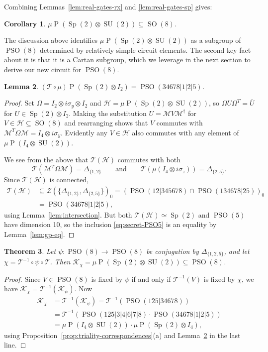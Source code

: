\documentclass[reqno]{amsart}
\newtheorem{theorem}{Theorem}[section]
\newtheorem{lemma}[theorem]{Lemma}
\newtheorem{corollary}[theorem]{Corollary}
\theoremstyle{definition} \newtheorem{example}[theorem]{Example}
\newcommand{\SU}{\operatorname{SU}}
\newcommand{\SO}{\operatorname{SO}}
\newcommand{\PSO}{\operatorname{PSO}}
\newcommand{\Sp}{\operatorname{Sp}}
\renewcommand{\P}{\operatorname{P}}
\renewcommand{\H}{\mathcal{H}}
\newcommand{\K}{\mathcal{K}}
\newcommand{\T}{\mathcal{T}}
\newcommand{\M}{\mathcal{M}}
\newcommand{\Z}{\mathcal{Z}}
\begin{document}
Combining Lemmas~\ref{lem:real-gates-rx} and \ref{lem:real-gates-sp} gives:
\begin{corollary} \label{cor:real-sp}
$\mu\P(\Sp(2) \otimes \SU(2))\subseteq \SO(8)$.
\end{corollary}

The discussion above identifies $\mu\P(\Sp(2) \otimes \SU(2))$ as a subgroup of $\PSO(8)$ determined by relatively simple circuit elements. The second key fact about it is that it is a Cartan subgroup, which we leverage in the next section to derive our new circuit for $\PSO(8)$.
\begin{lemma} \label{lem:triality-sp2} $(\T \circ \mu)\P(\Sp(2) \otimes I_2) = \PSO(34678|1|2|5)$.
\end{lemma}
\begin{proof}
Set $\Omega = I_2 \otimes i\sigma_y \otimes I_2$ and $\H = \mu\P(\Sp(2) \otimes \SU(2))$, so $\Omega U \Omega^T = \overline{U}$ for $U \in \Sp(2) \otimes I_2$. Making the substitution $U = \M V \M^\dagger$ for $V \in \H \subseteq \SO(8)$ and rearranging shows that $V$ commutes with $\M^T \Omega \M = I_4 \otimes i\sigma_y$. Evidently any $V \in \H$ also commutes with any element of $\mu\P(I_4 \otimes \SU(2))$.

We see from the above that $\T(\H)$ commutes with both
\begin{equation*}
\T(\M^T \Omega \M) = \Delta_{\{1,2\}} \qquad \text{and} \qquad \T(\mu(I_4 \otimes i\sigma_z)) = \Delta_{\{2,5\}}.
\end{equation*}
Since $\T(\H)$ is connected, 
\begin{align} \label{eq:secret-PSO5}
\T(\H) &\subseteq \Z(\{\Delta_{\{1,2\}},\Delta_{\{2,5\}}\})_0 = (\PSO(12|345678) \cap \PSO(134678|25))_0 \nonumber\\
&= \PSO(34678|1|2|5),
\end{align}
using Lemma~\ref{lem:intersection}. But both $\T(\H) \simeq \Sp(2)$ and $\PSO(5)$ have dimension 10, so the inclusion \eqref{eq:secret-PSO5} is an equality by Lemma~\ref{lem:gp-eq}.
\end{proof}


\begin{theorem} \label{thm:key-subgroup} Let $\psi : \PSO(8) \to \PSO(8)$ be conjugation by $\Delta_{\{1,2,5\}}$, and let $\chi = \T^{-1} \circ \psi \circ \T$. Then $\K_{\chi} = \mu \P(\Sp(2) \otimes \SU(2)) \subseteq \PSO(8)$.
\end{theorem}

\begin{proof}
Since $V \in \PSO(8)$ is fixed by $\psi$ if and only if $\T^{-1}(V)$ is fixed by $\chi$, we have $\K_{\chi} = \T^{-1}(\K_{\psi})$. Now
\begin{align*}
\K_{\chi} &= \T^{-1}(\K_{\psi}) = \T^{-1}(\PSO(125|34678))\\
&= \T^{-1}(\PSO(125|3|4|6|7|8) \cdot \PSO(34678|1|2|5))\\
&= \mu\P(I_4 \otimes \SU(2)) \cdot \mu\P(\Sp(2) \otimes I_4),
\end{align*}
using Proposition~\ref{prop:triality-correspondences}(a) and Lemma~\ref{lem:triality-sp2} in the last line.
\end{proof}
\end{document}
